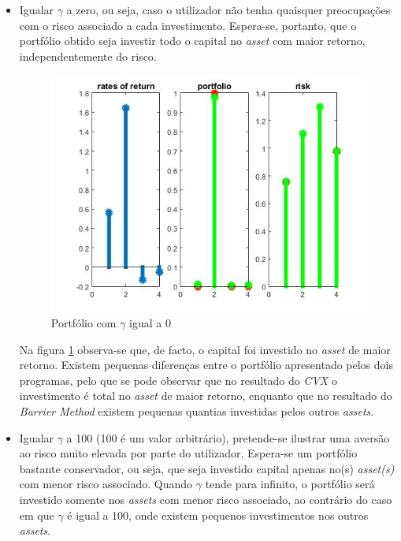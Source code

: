 \documentclass[a4paper]{IEEEtran}
\begin{document}
\begin{itemize}
\item Igualar $\gamma$ a zero, ou seja, caso o utilizador não tenha quaisquer preocupações com o risco associado a cada investimento. Espera-se, portanto, que o portfólio obtido seja investir todo o capital no \textit{asset} com maior retorno, independentemente do risco.
\begin{figure}[htp]
\captionsetup{font=scriptsize}  
  \centering
  \includegraphics[width=0.9\columnwidth]{./gama_0}
  \caption{Portfólio com $\gamma$ igual a 0}
  \label{fig:caso1}
\end{figure}

Na figura \ref{fig:caso1} observa-se que, de facto, o capital foi investido no \textit{asset} de maior retorno. Existem pequenas diferenças entre o portfólio apresentado pelos dois programas, pelo que se pode observar que no resultado do \textit{CVX} o investimento é total no \textit{asset} de maior retorno, enquanto que no resultado do \textit{Barrier Method} existem pequenas quantias investidas pelos outros \textit{assets}.
\vskip 4mm

\item Igualar $\gamma$ a 100 (100 é um valor arbitrário), pretende-se ilustrar uma aversão ao risco muito elevada por parte do utilizador. Espera-se um portfólio bastante conservador, ou seja, que seja investido capital apenas no(s) \textit{asset(s)} com menor risco associado. Quando $\gamma$ tende para infinito, o portfólio será investido somente nos \textit{assets} com menor risco associado, ao contrário do caso em que $\gamma$ é igual a 100, onde existem pequenos investimentos nos outros \textit{assets}.


\end{itemize}
\end{document}
